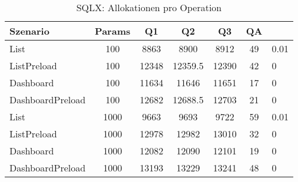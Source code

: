 \begin{table}[ht]
\centering
\caption{SQLX: Allokationen pro Operation}
\begin{tabular}{lccccc}
\toprule
Szenario & Params & Q1 & Q2 & Q3 & QA \\
\midrule
	List & 100 & 8863 & 8900 & 8912 & 49 & 0.01 \\
	ListPreload & 100 & 12348 & 12359.5 & 12390 & 42 & 0 \\
	Dashboard & 100 & 11634 & 11646 & 11651 & 17 & 0 \\
	DashboardPreload & 100 & 12682 & 12688.5 & 12703 & 21 & 0 \\
	List & 1000 & 9663 & 9693 & 9722 & 59 & 0.01 \\
	ListPreload & 1000 & 12978 & 12982 & 13010 & 32 & 0 \\
	Dashboard & 1000 & 12082 & 12090 & 12101 & 19 & 0 \\
	DashboardPreload & 1000 & 13193 & 13229 & 13241 & 48 & 0 \\
\bottomrule
\end{tabular}
\label{tab:benchmark_sqlx_allocsperop}
\end{table}
	